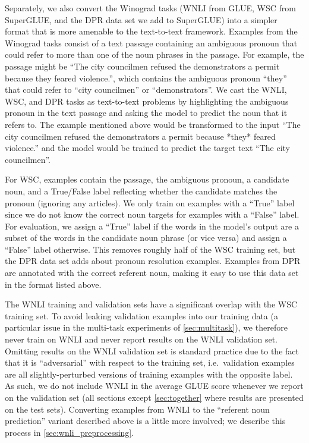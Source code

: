 \documentclass[twoside,11pt]{article}
\begin{document}
Separately, we also convert the Winograd tasks (WNLI from GLUE, WSC from SuperGLUE, and the DPR data set we add to SuperGLUE) into a simpler format that is more amenable to the text-to-text framework.
Examples from the Winograd tasks consist of a text passage containing an ambiguous pronoun that could refer to more than one of the noun phrases in the passage.
For example, the passage might be ``The city councilmen refused the demonstrators a permit because they feared violence.'', which contains the ambiguous pronoun ``they'' that could refer to ``city councilmen'' or ``demonstrators''.
We cast the WNLI, WSC, and DPR tasks as text-to-text problems by highlighting the ambiguous pronoun in the text passage and asking the model to predict the noun that it refers to.
The example mentioned above would be transformed to the input ``The city councilmen refused the demonstrators a permit because *they* feared violence.'' and the model would be trained to predict the target text ``The city councilmen''.

For WSC, examples contain the passage, the ambiguous pronoun, a candidate noun, and a True/False label reflecting whether the candidate matches the pronoun (ignoring any articles).
We only train on examples with a ``True'' label since we do not know the correct noun targets for examples with a ``False'' label.
For evaluation, we assign a ``True'' label if the words in the model's output are a subset of the words in the candidate noun phrase (or vice versa) and assign a ``False'' label otherwise.
This removes roughly half of the WSC training set, but the DPR data set adds about  pronoun resolution examples.
Examples from DPR are annotated with the correct referent noun, making it easy to use this data set in the format listed above.

The WNLI training and validation sets have a significant overlap with the WSC training set.
To avoid leaking validation examples into our training data (a particular issue in the multi-task experiments of \cref{sec:multitask}), we therefore never train on WNLI and never report results on the WNLI validation set.
Omitting results on the WNLI validation set is standard practice \citep{devlin2018bert} due to the fact that it is ``adversarial'' with respect to the training set, i.e.\ validation examples are all slightly-perturbed versions of training examples with the opposite label.
As such, we do not include WNLI in the average GLUE score whenever we report on the validation set (all sections except \cref{sec:together} where results are presented on the test sets).
Converting examples from WNLI to the ``referent noun prediction'' variant described above is a little more involved; we describe this process in \cref{sec:wnli_preprocessing}.
\end{document}
